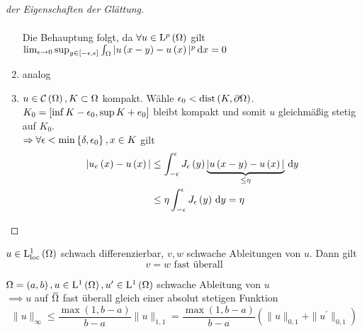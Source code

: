 \begin{proof}[der Eigenschaften der Glättung]
\begin{enumerate}
\begin{align*}
			\end{align*}
			Die Behauptung folgt, da $\forall u\in\mathrm{L}^{p}\left(\Omega\right)$ gilt $\lim_{\epsilon\to 0}\operatorname{sup}_{y\in\left[-\epsilon,\epsilon\right]}\int_{\Omega}|u\left(x-y\right)-u\left(x\right)|^{p}\,\mathrm{d}x = 0$
		\item analog
		\item $u\in\mathcal{C}\left(\Omega\right), K\subset\Omega$ kompakt. Wähle $\epsilon_{0}<\operatorname{dist}\left(K,\partial\Omega\right)$.\\
			$K_{0} = \left[\operatorname{inf}K-\epsilon_{0},\operatorname{sup}K+e_{0}\right]$ bleibt kompakt und somit $u$ gleichmäßig stetig auf $K_{0}$.\\
			$\Rightarrow \forall\epsilon<\operatorname{min}\left\{\delta,\epsilon_{0}\right\}, x\in K$ gilt
			\begin{align*}
				|u_{e}\left(x\right)-u\left(x\right)|&\leq\int_{-\epsilon}^{\epsilon}J_{\epsilon}\left(y\right)\underbrace{|u\left(x-y\right)-u\left(x\right)|}_{\leq\eta}\,\mathrm{d}y\\
					&\leq \eta\int_{-\epsilon}^{\epsilon}J_{\epsilon}\left(y\right)\,\mathrm{d}y = \eta
			\end{align*}
	\end{enumerate}
\end{proof}

\begin{cor}
	$u\in\mathrm{L}^{1}_{\text{loc}}\left(\Omega\right)$ schwach differenzierbar, $v,w$ schwache Ableitungen von $u$. Dann gilt
	\begin{equation*}
		v = w \text{ fast überall}
	\end{equation*}
\end{cor}
\begin{lemma}[Satz]
	$\Omega=\left(a,b\right),u\in\mathrm{L}^{1}\left(\Omega\right),u^{\prime}\in\mathrm{L}^{1}\left(\Omega\right)$ schwache Ableitung von $u$\\
	$\implies u$ auf $\overbar{\W}$ fast überall gleich einer absolut stetigen Funktion\\
	\begin{equation*}
		\|u\|_{\infty} \leq\frac{\operatorname{max}\left(1,b-a\right)}{b-a}\|u\|_{1,1} = \frac{\operatorname{max}\left(1,b-a\right)}{b-a}\left(\|u\|_{0,1}+\|u^{\prime}\|_{0,1}\right)
	\end{equation*}
\end{lemma}
